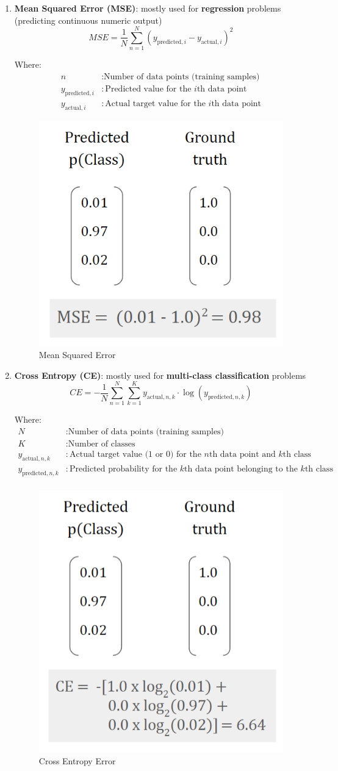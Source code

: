 \begin{enumerate}
    \item \textbf{Mean Squared Error (MSE)}: mostly used for \textbf{regression} problems (predicting continuous numeric output)
\[
MSE = \frac{1}{N} \sum_{n=1}^{N} (y_{\text{predicted}, i} - y_{\text{actual}, i})^2
\]

Where:
\begin{align*}
n &: \text{Number of data points (training samples)} \\
y_{\text{predicted}, i} &: \text{Predicted value for the } i\text{th data point} \\
y_{\text{actual}, i} &: \text{Actual target value for the } i\text{th data point}
\end{align*}
\begin{figure}[h!t]
    \centering
    \includegraphics[width=0.25\linewidth]{mse.png}
    \caption{Mean Squared Error}
    \label{fig:enter-label}
\end{figure}
    \item \textbf{Cross Entropy (CE)}: mostly used for \textbf{multi-class classification} problems
\[
CE = - \frac{1}{N} \sum_{n=1}^{N} \sum_{k=1}^{K}  y_{\text{actual}, n, k} \cdot \log(y_{\text{predicted}, n, k}) 
\]

Where:
\begin{align*}
N &: \text{Number of data points (training samples)} \\
K &: \text{Number of classes} \\
y_{\text{actual}, n, k} &: \text{Actual target value (1 or 0) for the } n\text{th data point and } k\text{th class} \\
y_{\text{predicted}, n, k} &: \text{Predicted probability for the } k\text{th data point belonging to the } k\text{th class} \\
\end{align*}
\begin{figure}[h!t]
    \centering
    \includegraphics[width=0.25\linewidth]{ce.png}
    \caption{Cross Entropy Error}
    \label{fig:enter-label}
\end{figure}


\end{enumerate}
